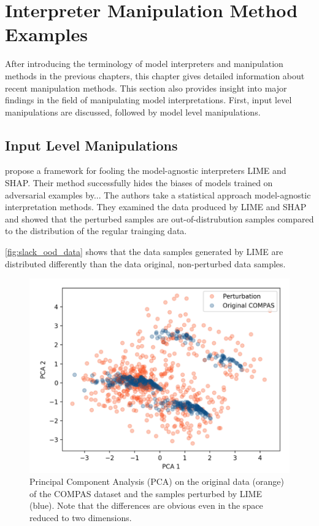 \section{Interpreter Manipulation Method Examples}
\label{sec:manipulations}

After introducing the terminology of model interpreters and manipulation methods in the previous chapters, this chapter gives detailed information about recent manipulation methods. This section also provides insight into major findings in the field of manipulating model interpretations. First, input level manipulations are discussed, followed by model level manipulations. 

\subsection{Input Level Manipulations}

\newline
\cite{advlime_aies20} propose a framework for fooling the model-agnostic interpreters LIME and SHAP. Their method successfully hides the biases of models trained on adversarial examples by... 
The authors take a statistical approach model-agnostic interpretation methods. They examined the data produced by LIME and SHAP and showed that the perturbed samples are out-of-distrubution samples compared to the distribution of the regular trainging data. 

\autoref{fig:slack_ood_data} shows that the data samples generated by LIME are distributed differently than the data original, non-perturbed data samples. 

\begin{figure}[ht]
    \centering
    \includegraphics[width=\linewidth]{figures/slack_ood_data.png}
    \caption{Principal Component Analysis (PCA) on the original data (orange) of the COMPAS dataset and the samples perturbed by LIME (blue). Note that the differences are obvious even in the space reduced to two dimensions.}
    \label{fig:slack_ood_data}
    \vspace{-0.3cm}
\end{figure}

